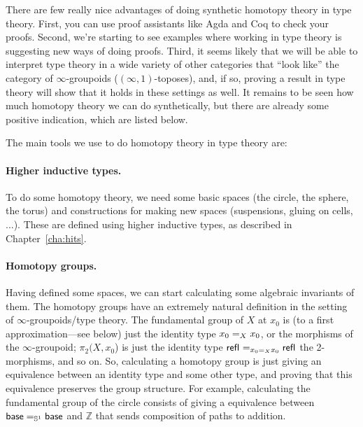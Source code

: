 There are few really nice advantages of doing synthetic homotopy theory
in type theory.  First, you can use proof assistants like Agda and Coq
to check your proofs.  Second, we're starting to see examples where
working in type theory is suggesting new ways of doing proofs.  Third,
it seems likely that we will be able to interpret type theory in a wide
variety of other categories that ``look like'' the category of
$\infty$-groupoids ($(\infty,1)$-toposes), and, if so, proving a result
in type theory will show that it holds in these settings as well. It
remains to be seen how much homotopy theory we can do synthetically, but
there are already some positive indication, which are listed below.

The main tools we use to do homotopy theory in type theory are:

\paragraph{Higher inductive types.} To do some homotopy theory, we need some
  basic spaces (the circle, the sphere, the torus) and constructions for
  making new spaces (suspensions, gluing on cells, ...).  These are
  defined using higher inductive types, as described in
  Chapter~\ref{cha:hits}.

\paragraph{Homotopy groups.}  Having defined some spaces, we can start
  calculating some algebraic invariants of them.  The homotopy groups
  have an extremely natural definition in the setting of
  $\infty$-groupoids/type theory.  The fundamental group of $X$ at $x_0$
  is (to a first approximation---see below) just the identity type
  $\id[X] {x_0} {x_0}$, or the morphisms of the $\infty$-groupoid;
  $\pi_2(X,x_0$) is just the identity type $\id[{\id[X] {x_0} {x_0}}]
  {\refl{}}{\refl{}}$ the 2-morphisms, and so on.  So, calculating a
  homotopy group is just giving an equivalence between an identity type
  and some other type, and proving that this equivalence preserves the
  group structure.  For example, calculating the fundamental group of
  the circle consists of giving a equivalence between $\id[{\Sn ^1}]
  \base \base$ and $\mathbb{Z}$ that sends composition of paths to
  addition.

